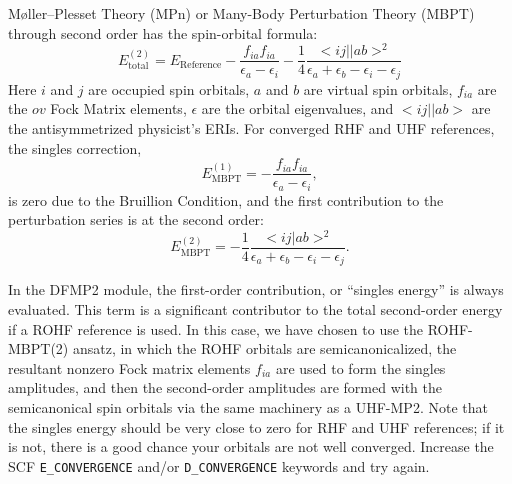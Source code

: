 M\o{}ller--Plesset Theory (MPn) or Many-Body Perturbation Theory (MBPT) through second order has the spin-orbital formula:
\begin{equation}
E_{\mathrm{total}}^{(2)}  = E_{\mathrm{Reference}} - \frac{f_{ia}
f_{ia}}{\epsilon_a - \epsilon_i} - \frac{1}{4} \frac{<ij||ab>^2}{\epsilon_a + \epsilon_b - \epsilon_i - \epsilon_j}
\end{equation}
Here $i$ and $j$ are occupied spin orbitals, $a$ and $b$ are virtual spin
orbitals, $f_{ia}$ are the $ov$ Fock Matrix elements, $\epsilon$ are the orbital
eigenvalues, and $<ij||ab>$ are the antisymmetrized physicist's ERIs. For
converged RHF and UHF references, the singles correction,
\begin{equation}
E_{\mathrm{MBPT}}^{(1)} = - \frac{f_{ia} f_{ia}}{\epsilon_a - \epsilon_i},
\end{equation}
is zero due to the Bruillion Condition, and the first contribution to the perturbation series is at the second order:
\begin{equation}
E_{\mathrm{MBPT}}^{(2)}  = - \frac{1}{4} \frac{<ij|ab>^2}{\epsilon_a + \epsilon_b - \epsilon_i - \epsilon_j}.
\end{equation}

In the DFMP2 module, the first-order contribution, or ``singles energy'' is
always evaluated. This term is a significant contributor to the total
second-order energy if a ROHF reference is used. In this case, we have chosen
to use the ROHF-MBPT(2) ansatz, in which the ROHF orbitals are
semicanonicalized, the resultant nonzero Fock matrix elements $f_{ia}$ are used
to form the singles amplitudes, and then the second-order amplitudes are formed
with the semicanonical spin orbitals via the same machinery as a UHF-MP2. Note
that the singles energy should be very close to zero for RHF and UHF references;
if it is not, there is a good chance your orbitals are not well converged.
Increase the SCF \texttt{E\_CONVERGENCE} and/or \texttt{D\_CONVERGENCE} keywords
and try again. 

